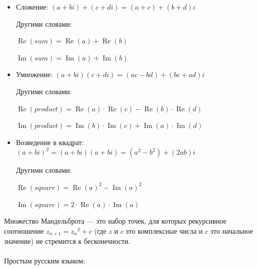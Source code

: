\begin{itemize}
\item Сложение: $(a+bi) + (c+di) = (a+c) + (b+d)i$

Другими словами:

$\operatorname{Re}(sum) = \operatorname{Re}(a) + \operatorname{Re}(b)$

$\operatorname{Im}(sum) = \operatorname{Im}(a) + \operatorname{Im}(b)$

\item Умножение: $(a+bi) (c+di) = (ac-bd) + (bc+ad)i$

Другими словами:

$\operatorname{Re}(product) = \operatorname{Re}(a) \cdot \operatorname{Re}(c) - \operatorname{Re}(b) \cdot \operatorname{Re}(d)$

$\operatorname{Im}(product) = \operatorname{Im}(b) \cdot \operatorname{Im}(c) + \operatorname{Im}(a) \cdot \operatorname{Im}(d)$

\item Возведение в квадрат: $(a+bi)^2 = (a+bi) (a+bi) = (a^2-b^2) + (2ab)i$

Другими словами:

$\operatorname{Re}(square) = \operatorname{Re}(a)^2-\operatorname{Im}(a)^2$

$\operatorname{Im}(square) = 2 \cdot \operatorname{Re}(a) \cdot \operatorname{Im}(a)$

\end{itemize}


Множество Мандельброта --- это набор точек, для которых рекурсивное соотношение
 $z_{n+1} = {z_n}^2 + c$ 
(где $z$ и $c$ это комплексные числа и $c$ это начальное значение) не стремится к бесконечности.\\
\\
Простым русским языком: 

